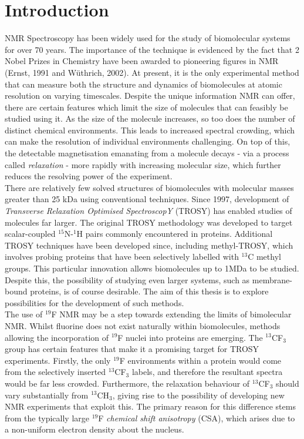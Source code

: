 
\chapter{Introduction}

NMR Spectroscopy has been widely used for the study of biomolecular systems for over 70 years. The importance of the technique is evidenced by the fact that 2 Nobel Prizes in Chemistry have been awarded to pioneering figures in NMR (Ernst, 1991 and W\"{u}thrich, 2002). At present, it is the only experimental method that can measure both the structure and dynamics of biomolecules at atomic resolution on varying timescales.  Despite the unique information NMR can offer, there are certain features which limit the size of molecules that can feasibly be studied using it. As the size of the molecule increases, so too does the number of distinct chemical environments. This leads to increased spectral crowding, which can make the resolution of individual environments challenging. On top of this, the detectable magnetisation emanating from a molecule decays - via a process called \textit{relaxation} - more rapidly with increasing molecular size, which further reduces the resolving power of the experiment.\\
There are relatively few solved structures of biomolecules with molecular masses greater than 25 kDa using conventional techniques\cite{RN14}. Since 1997, development of \textit{Transverse Relaxation Optimised SpectroscopY} (TROSY) has enabled studies of molecules far larger. The original TROSY methodology was developed to target scalar-coupled $^{15}$N-$^1$H pairs commonly encountered in proteins\cite{RN15}. Additional TROSY techniques have been developed since, including methyl-TROSY, which involves probing proteins that have been selectively labelled with $^{13}$C methyl groups\cite{RN17, RN37}. This particular innovation allows biomolecules up to 1MDa to be studied\cite{RN16,RN35,RN36,RN22}. Despite this, the possibility of studying even larger systems, such as membrane-bound proteins, is of course desirable. The aim of this thesis is to explore possibilities for the development of such methods.\\
The use of $^{19}$F NMR may be a step towards extending the limits of bimolecular NMR. Whilst fluorine does not exist naturally within biomolecules, methods allowing the incorporation of $^{19}$F nuclei into proteins are emerging\cite{RN19}. The $^{13}$CF$_3$ group has certain features that make it a promising target for TROSY experiments. Firstly, the only $^{19}$F environments within a protein would come from the selectively inserted $^{13}$CF$_3$ labels, and therefore the resultant spectra would be far less crowded. Furthermore, the relaxation behaviour of $^{13}$CF$_3$ should vary substantially from $^{13}$CH$_3$, giving rise to the possibility of developing new NMR experiments that exploit this. The primary reason for this difference stems from the typically large $^{19}$F \textit{chemical shift anisotropy} (CSA), which arises due to a non-uniform electron density about the nucleus.\\
